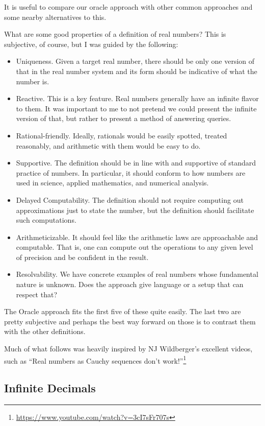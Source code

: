 \documentclass[12pt]{article}
\begin{document}
It is useful to compare our oracle approach with other common approaches and some nearby alternatives to this. 

What are some good properties of a definition of real numbers? This is subjective, of course, but I was guided by the following: 

\begin{itemize}
    \item Uniqueness. Given a target real number, there should be only one version of that in the real number system and its form should be indicative of what the number is. 
    \item Reactive. This is a key feature. Real numbers generally have an infinite flavor to them. It was important to me to not pretend we could present the infinite version of that, but rather to present a method of answering queries. 
    \item Rational-friendly. Ideally, rationals would be easily spotted, treated reasonably, and arithmetic with them would be easy to do. 
    \item Supportive. The definition should be in line with and supportive of standard practice of numbers. In particular, it should conform to how numbers are used in science, applied mathematics, and numerical analysis. 
    \item Delayed Computability. The definition should not require computing out approximations just to  state the number, but the definition should facilitate such computations. 
    \item Arithmeticizable. It should feel like the arithmetic laws are approachable and computable. That is, one can compute out the operations to any given level of precision and be confident in the result.
    \item Resolvability. We have concrete examples of real numbers whose fundamental nature is unknown. Does the approach give language or a setup that can respect that? 
\end{itemize}

The Oracle approach fits the first five of these quite easily. The last two are pretty subjective and perhaps the best way forward on those is to contrast them with the other definitions. 

Much of what follows was heavily inspired by NJ Wildberger's excellent videos, such as ``Real numbers as Cauchy sequences don't work!''\footnote{\url{https://www.youtube.com/watch?v=3cI7sFr707s}}


\subsection{Infinite Decimals}
\end{document}
